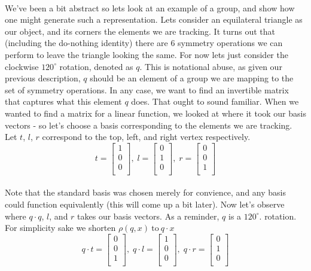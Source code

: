 \documentclass[twoside]{article}
\begin{document}
\paragraph*{} We've been a bit abstract so lets look at an example of a group, 
and show how one might generate such a representation. Lets consider an equilateral 
triangle as our object, and its corners the elements we are tracking. It turns out 
that (including the do-nothing identity) there are 6 symmetry operations we can 
perform to leave the triangle looking the same. For now lets just consider the 
clockwise ${120}^{\circ}$ rotation, denoted as $q$. This is notational abuse, as given 
our previous description, $q$ should be an element of a group we are mapping to the 
set of symmetry operations. 
In any case, we want to find an invertible matrix 
that captures what this element $q$ does. That ought to sound familiar. When we wanted 
to find a matrix for a linear function, we looked at where it took our basis 
vectors - so let's choose a basis corresponding to the elements we are tracking. 
Let $t$, $l$, $r$ correspond to the top, left, and right vertex respectively. 
\[
t = 
\begin{bmatrix}
1 \\
0 \\
0 \\
\end{bmatrix}, \;
l = 
\begin{bmatrix}
0 \\
1 \\
0 \\
\end{bmatrix}, \;
r = 
\begin{bmatrix}
0 \\
0 \\
1 \\
\end{bmatrix}
\] 
\paragraph*{}  Note that the standard basis was chosen merely for convience, 
and any basis could function equivalently (this will come up a bit later). 
Now let's observe where $q \cdot q$, $l$, and $r$ takes our basis vectors. As a 
reminder, $q$ is a ${120}^{\circ}$. rotation. For simplicity sake we shorten 
$\rho(q, x)\: \text{to} \: q \cdot x$
\[
q \cdot t = 
\begin{bmatrix}
0 \\
0 \\
1 \\
\end{bmatrix}, \;
q \cdot l = 
\begin{bmatrix}
1 \\
0 \\
0 \\
\end{bmatrix}, \;
q \cdot r = 
\begin{bmatrix}
0 \\
1 \\
0 \\
\end{bmatrix}
\]
\end{document}
